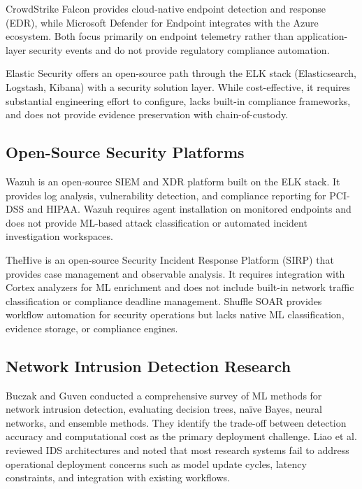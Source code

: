 \documentclass[conference]{IEEEtran}
\begin{document}
CrowdStrike Falcon \cite{crowdstrike2022} provides cloud-native endpoint detection and response (EDR), while Microsoft Defender for Endpoint \cite{microsoft2023defender} integrates with the Azure ecosystem. Both focus primarily on endpoint telemetry rather than application-layer security events and do not provide regulatory compliance automation.

Elastic Security \cite{elastic2023} offers an open-source path through the ELK stack (Elasticsearch, Logstash, Kibana) with a security solution layer. While cost-effective, it requires substantial engineering effort to configure, lacks built-in compliance frameworks, and does not provide evidence preservation with chain-of-custody.

\subsection{Open-Source Security Platforms}

Wazuh \cite{wazuh2023} is an open-source SIEM and XDR platform built on the ELK stack. It provides log analysis, vulnerability detection, and compliance reporting for PCI-DSS and HIPAA. Wazuh requires agent installation on monitored endpoints and does not provide ML-based attack classification or automated incident investigation workspaces.

TheHive \cite{thehive2023} is an open-source Security Incident Response Platform (SIRP) that provides case management and observable analysis. It requires integration with Cortex analyzers for ML enrichment and does not include built-in network traffic classification or compliance deadline management. Shuffle SOAR \cite{shuffle2022} provides workflow automation for security operations but lacks native ML classification, evidence storage, or compliance engines.

\subsection{Network Intrusion Detection Research}

Buczak and Guven \cite{buczak2016survey} conducted a comprehensive survey of ML methods for network intrusion detection, evaluating decision trees, na\"{i}ve Bayes, neural networks, and ensemble methods. They identify the trade-off between detection accuracy and computational cost as the primary deployment challenge. Liao et al. \cite{liao2013ids} reviewed IDS architectures and noted that most research systems fail to address operational deployment concerns such as model update cycles, latency constraints, and integration with existing workflows.
\end{document}
